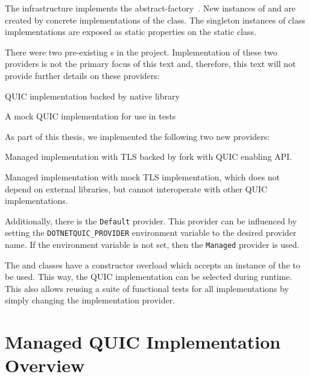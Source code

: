 The infrastructure implements the \gls{abstract-factory}~\cite{wiki:abstract-factory-pattern}. New
instances of \QuicListenerProvider{} and \QuicConnectionProvider{} are created by concrete
implementations of the \QuicImplementationProvider{} class. The singleton instances of
\QuicImplementationProvider{} class implementations are exposed as static properties on the
 static class.

There were two pre-existing \QuicImplementationProvider{}s in the 
project. Implementation of these two providers is not the primary focus of this text and, therefore,
this text will not provide further details on these providers:

\begin{itemize}

   QUIC implementation backed by \libmsquic{} native library

   A mock QUIC implementation for use in tests

\end{itemize}

As part of this thesis, we implemented the following two new providers:

\begin{itemize}

   Managed implementation with TLS backed by \libopenssl{} fork with QUIC
enabling API\@.

   Managed implementation with mock TLS implementation, which does
not depend on external libraries, but cannot interoperate with other QUIC implementations.

\end{itemize}

Additionally, there is the \texttt{Default} provider. This provider can be influenced by setting the
\texttt{DOTNETQUIC_PROVIDER} environment variable to the desired provider name. If the environment
variable is not set, then the \texttt{Managed} provider is used.

The \QuicListener{} and \QuicConnection{} classes have a constructor overload which accepts an
instance of the \QuicImplementationProvider{} to be used. This way, the QUIC implementation can be
selected during runtime. This also allows reusing a suite of functional tests for all
implementations by simply changing the implementation provider.

\section{Managed QUIC Implementation Overview}

